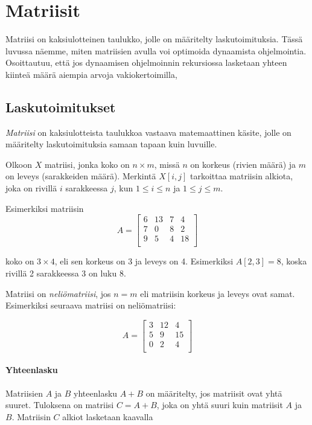 \chapter{Matriisit}

Matriisi on kaksiulotteinen taulukko,
jolle on määritelty laskutoimituksia.
Tässä luvussa näemme, miten matriisien
avulla voi optimoida dynaamista ohjelmointia.
Osoittautuu, että jos dynaamisen ohjelmoinnin rekursiossa
lasketaan yhteen kiinteä määrä aiempia arvoja
vakiokertoimilla,

\section{Laskutoimitukset}

\textit{Matriisi} on
kaksiulotteista taulukkoa
vastaava matemaattinen käsite,
jolle on määritelty laskutoimituksia
samaan tapaan kuin luvuille.

Olkoon $X$ matriisi, jonka koko on $n \times m$,
missä $n$ on korkeus (rivien määrä)
ja $m$ on leveys (sarakkeiden määrä).
Merkintä $X[i,j]$ tarkoittaa matriisin alkiota,
joka on rivillä $i$ sarakkeessa $j$,
kun $1 \le i \le n$ ja $1 \le j \le m$.

Esimerkiksi matriisin
\[
A = 
 \begin{bmatrix}
  6 & 13 & 7 & 4 \\
  7 & 0 & 8 & 2 \\
  9 & 5 & 4 & 18 \\
 \end{bmatrix}
\]

koko on $3 \times 4$,
eli sen korkeus on 3 ja leveys on 4.
Esimerkiksi $A[2,3]=8$,
koska rivillä 2 sarakkeessa 3
on luku 8.

Matriisi on \textit{neliömatriisi}, jos $n=m$ eli
matriisin korkeus ja leveys ovat samat.
Esimerkiksi seuraava matriisi on neliömatriisi:

\[
A = 
 \begin{bmatrix}
  3 & 12 & 4  \\
  5 & 9 & 15  \\
  0 & 2 & 4 \\
 \end{bmatrix}
\]

\subsubsection{Yhteenlasku}

Matriisien $A$ ja $B$ yhteenlasku $A+B$ on määritelty,
jos matriisit ovat yhtä suuret.
Tuloksena on matriisi $C=A+B$,
joka on yhtä suuri kuin matriisit $A$ ja $B$.
Matriisin $C$ alkiot lasketaan kaavalla

